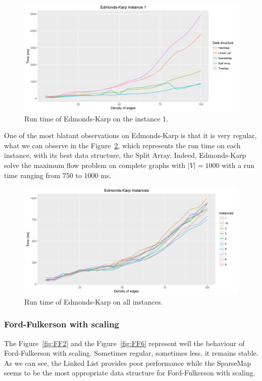 \begin{figure}[H]
\includegraphics[scale=0.5]{images/EK1.png}
\caption{Run time of Edmonds-Karp on the instance 1.}
\label{fig:EK1}
\end{figure}

One of the most blatant observations on Edmonds-Karp is that it is very regular, what we can observe in the Figure~\ref{fig:EKmean}, which represents the run time on each instance, with its best data structure, the Split Array. Indeed, Edmonds-Karp solve the maximum flow problem on complete graphs with $|V|=1000$ with a run time ranging from 750 to 1000 ms.

\begin{figure}[H]
\includegraphics[scale=0.5]{images/EKmean.png}
\caption{Run time of Edmonds-Karp on all instances.}
\label{fig:EKmean}
\end{figure}

\subsubsection{Ford-Fulkerson with scaling}
The Figure~\ref{fig:FF2} and the Figure~\ref{fig:FF6} represent well the behaviour of Ford-Fulkerson with scaling. Sometimes regular, sometimes less, it remains stable. As we can see, the Linked List provides poor performance while the SparseMap seems to be the most appropriate data structure for Ford-Fulkerson with scaling.

